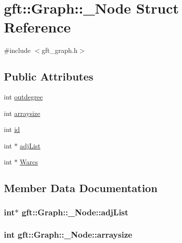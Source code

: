 \hypertarget{structgft_1_1Graph_1_1__Node}{}\section{gft\+:\+:Graph\+:\+:\+\_\+\+Node Struct Reference}
\label{structgft_1_1Graph_1_1__Node}


{\ttfamily \#include $<$gft\+\_\+graph.\+h$>$}

\subsection*{Public Attributes}
\begin{DoxyCompactItemize}
\item 
int \hyperlink{structgft_1_1Graph_1_1__Node_ace8a528045d81543c6fe13a62d0bfb0d}{outdegree}
\item 
int \hyperlink{structgft_1_1Graph_1_1__Node_a3bf441dbd3109bb46136c4e413015cc3}{arraysize}
\item 
int \hyperlink{structgft_1_1Graph_1_1__Node_a814e66dd62a8bc908600b275762f095a}{id}
\item 
int $\ast$ \hyperlink{structgft_1_1Graph_1_1__Node_a50c5a52bde74c61eb535531e3b24146a}{adj\+List}
\item 
int $\ast$ \hyperlink{structgft_1_1Graph_1_1__Node_aa214fccc7e7d1f5d08f9c05f8b1ead6c}{Warcs}
\end{DoxyCompactItemize}


\subsection{Member Data Documentation}
\subsubsection[{\texorpdfstring{adj\+List}{adjList}}]{\setlength{\rightskip}{0pt plus 5cm}int$\ast$ gft\+::\+Graph\+::\+\_\+\+Node\+::adj\+List}\hypertarget{structgft_1_1Graph_1_1__Node_a50c5a52bde74c61eb535531e3b24146a}{}\label{structgft_1_1Graph_1_1__Node_a50c5a52bde74c61eb535531e3b24146a}
\subsubsection[{\texorpdfstring{arraysize}{arraysize}}]{\setlength{\rightskip}{0pt plus 5cm}int gft\+::\+Graph\+::\+\_\+\+Node\+::arraysize}\hypertarget{structgft_1_1Graph_1_1__Node_a3bf441dbd3109bb46136c4e413015cc3}{}\label{structgft_1_1Graph_1_1__Node_a3bf441dbd3109bb46136c4e413015cc3}
